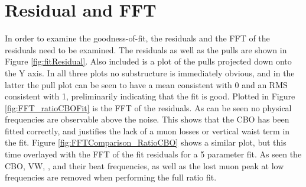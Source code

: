 \clearpage

\section{Residual and FFT}

	In order to examine the goodness-of-fit, the residuals and the FFT of the residuals need to be examined. The residuals as well as the pulls are shown in Figure \ref{fig:fitResidual}. Also included is a plot of the pulls projected down onto the Y axis. In all three plots no substructure is immediately obvious, and in the latter the pull plot can be seen to have a mean consistent with 0 and an RMS consistent with 1, preliminarily indicating that the fit is good. Plotted in Figure \ref{fig:FFT_ratioCBOFit} is the FFT of the residuals. As can be seen no physical frequencies are observable above the noise. This shows that the CBO has been fitted correctly, and justifies the lack of a muon losses or vertical waist term in the fit. Figure \ref{fig:FFTComparison_RatioCBO} shows a similar plot, but this time overlayed with the FFT of the fit residuals for a 5 parameter fit. As seen the CBO, VW, \gmtwo, and their beat frequencies, as well as the lost muon peak at low frequencies are removed when performing the full ratio fit.


